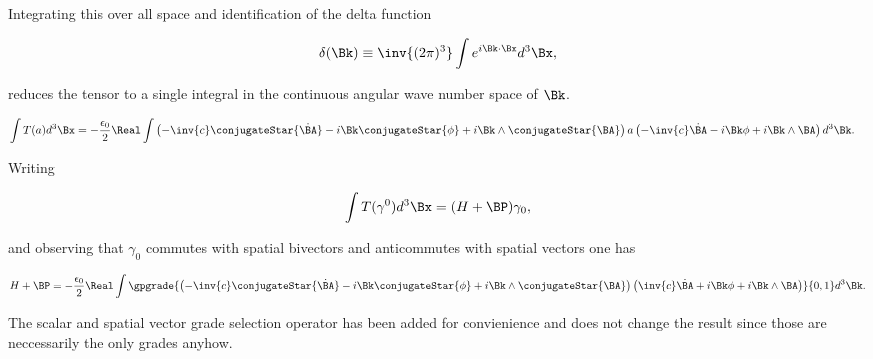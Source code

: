Integrating this over all space and identification of the delta function

\begin{align}\label{eqn:ftMaxVacuum:9}
\delta(\Bk) \equiv \inv{(2 \pi)^3} \int e^{i \Bk \cdot \Bx} d^3 \Bx,
\end{align}

reduces the tensor to a single integral in the continuous angular wave number space of $\Bk$.

\begin{align}\label{eqn:ftMaxVacuum:10}
\int T(a) d^3 \Bx &= -\frac{\epsilon_0}{2} \Real \int 
\left( 
- \inv{c} \conjugateStar{\dot{\BA}}
- i \Bk \conjugateStar{\phi}
+ i \Bk \wedge \conjugateStar{\BA}
\right)
a
\left( 
- \inv{c} \dot{\BA}
- i \Bk \phi
+ i \Bk \wedge \BA
\right)
d^3 \Bk.
\end{align}

Writing 

\begin{align}\label{eqn:ftMaxVacuum:11}
\int T(\gamma^0) d^3 \Bx = (H + \BP) \gamma_0,
\end{align}

and observing that $\gamma_0$ commutes with spatial bivectors and anticommutes with spatial vectors one has

\begin{align}\label{eqn:ftMaxVacuum:12}
H + \BP =
-\frac{\epsilon_0}{2} \Real \int 
\gpgrade{
\left( 
- \inv{c} \conjugateStar{\dot{\BA}}
- i \Bk \conjugateStar{\phi}
+ i \Bk \wedge \conjugateStar{\BA}
\right)
\left( 
\inv{c} \dot{\BA}
+ i \Bk \phi
+ i \Bk \wedge \BA
\right)
}{0,1}
d^3 \Bk.
\end{align}

The scalar and spatial vector grade selection operator has been added for convienience and does not change the result since those are neccessarily the only grades anyhow.

\EndArticle
